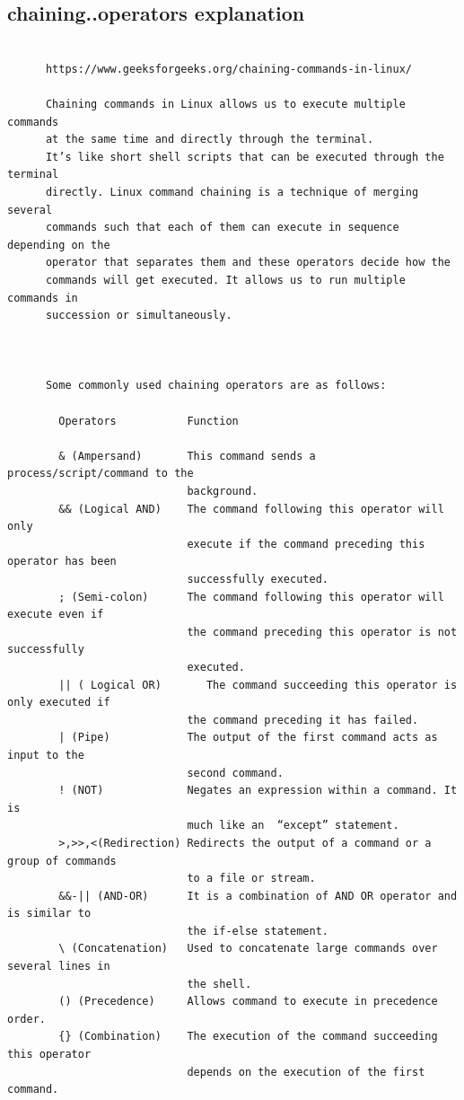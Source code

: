\documentclass[a4paper,12pt]{article}
\begin{document}
\subsection{chaining..operators explanation}
\begin{verbatim}
      
      https://www.geeksforgeeks.org/chaining-commands-in-linux/     
      
      Chaining commands in Linux allows us to execute multiple commands 
      at the same time and directly through the terminal. 
      It’s like short shell scripts that can be executed through the terminal 
      directly. Linux command chaining is a technique of merging several 
      commands such that each of them can execute in sequence depending on the    
      operator that separates them and these operators decide how the
      commands will get executed. It allows us to run multiple commands in 
      succession or simultaneously.


 
      Some commonly used chaining operators are as follows:

        Operators           Function

        & (Ampersand)       This command sends a process/script/command to the  
                            background. 
        && (Logical AND)    The command following this operator will only 
                            execute if the command preceding this operator has been  
                            successfully executed. 
        ; (Semi-colon)      The command following this operator will execute even if  
                            the command preceding this operator is not successfully  
                            executed.
        || ( Logical OR)	   The command succeeding this operator is only executed if   
                            the command preceding it has failed.
        | (Pipe)            The output of the first command acts as input to the 
                            second command.
        ! (NOT)             Negates an expression within a command. It is 
                            much like an  “except” statement.
        >,>>,<(Redirection) Redirects the output of a command or a group of commands   
                            to a file or stream.
        &&-|| (AND-OR)      It is a combination of AND OR operator and is similar to 
                            the if-else statement.
        \ (Concatenation)   Used to concatenate large commands over several lines in    
                            the shell.
        () (Precedence)     Allows command to execute in precedence order.
        {} (Combination)    The execution of the command succeeding this operator   
                            depends on the execution of the first command.
\end{verbatim}
\end{document}
